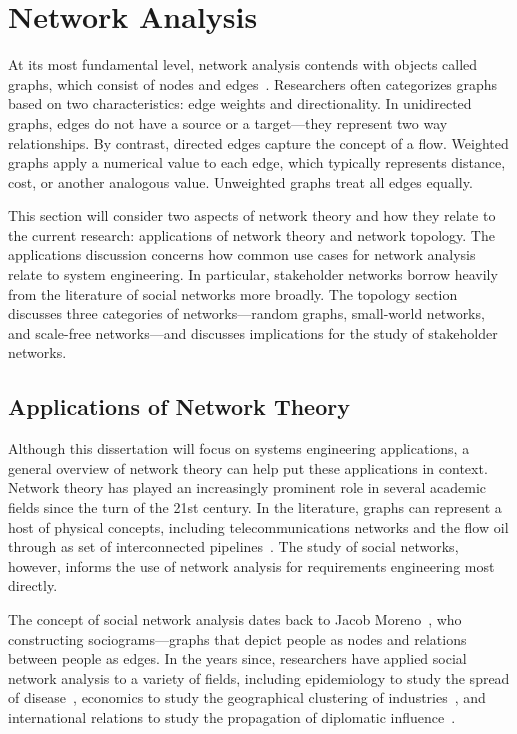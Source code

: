 \section{Network Analysis}

At its most fundamental level, network analysis contends with objects called graphs, which consist of nodes and edges~\cite{diestel}. Researchers often categorizes graphs based on two characteristics: edge weights and directionality. In unidirected graphs, edges do not have a source or a target---they represent two way relationships. By contrast, directed edges capture the concept of a flow. Weighted graphs apply a numerical value to each edge, which typically represents distance, cost, or another analogous value. Unweighted graphs treat all edges equally. 

This section will consider two aspects of network theory and how they relate to the current research: applications of network theory and network topology. The applications discussion concerns how common use cases for network analysis relate to system engineering. In particular, stakeholder networks borrow heavily from the literature of social networks more broadly. The topology section discusses three categories of networks---random graphs, small-world networks, and scale-free networks---and discusses implications for the study of stakeholder networks.

\subsection{Applications of Network Theory}

Although this dissertation will focus on systems engineering applications, a general overview of network theory can help put these applications in context. Network theory has played an increasingly prominent role in several academic fields since the turn of the 21st century. In the literature, graphs can represent a host of physical concepts, including telecommunications networks and the flow oil through as set of interconnected pipelines~\cite{barbasi}. The study of social networks, however, informs the use of network analysis for requirements engineering most directly.

The concept of social network analysis dates back to Jacob Moreno~\cite{moreno}, who constructing sociograms---graphs that depict people as nodes and relations between people as edges. In the years since, researchers have applied social network analysis to a variety of fields, including epidemiology to study the spread of disease~\cite{moreno}, economics to study the geographical clustering of industries~\cite{moretti}, and international relations to study the propagation of diplomatic influence~\cite{slaughter}. 

